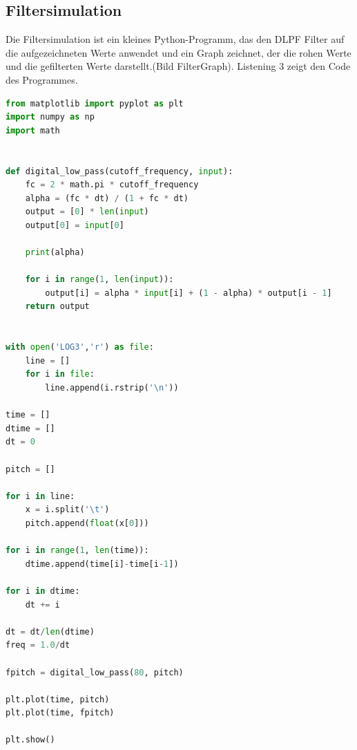 \documentclass[12pt,a4paper, ngerman]{article}
\begin{document}
\subsection{Filtersimulation}
Die Filtersimulation ist ein kleines Python-Programm, das den DLPF Filter auf die aufgezeichneten Werte anwendet und ein Graph zeichnet, der die rohen Werte und die gefilterten Werte darstellt.(Bild FilterGraph). Listening 3 zeigt den Code des Programmes. 
\begin{lstlisting}[language=Python,caption=Filtersimulation]
from matplotlib import pyplot as plt
import numpy as np
import math


def digital_low_pass(cutoff_frequency, input):
    fc = 2 * math.pi * cutoff_frequency
    alpha = (fc * dt) / (1 + fc * dt)
    output = [0] * len(input)
    output[0] = input[0]

    print(alpha)

    for i in range(1, len(input)):
        output[i] = alpha * input[i] + (1 - alpha) * output[i - 1]
    return output


with open('LOG3','r') as file:
    line = []
    for i in file:
        line.append(i.rstrip('\n'))

time = []
dtime = []
dt = 0

pitch = []

for i in line:
    x = i.split('\t')
    pitch.append(float(x[0]))

for i in range(1, len(time)):
    dtime.append(time[i]-time[i-1])

for i in dtime:
    dt += i

dt = dt/len(dtime)
freq = 1.0/dt

fpitch = digital_low_pass(80, pitch)

plt.plot(time, pitch)
plt.plot(time, fpitch)

plt.show()
\end{lstlisting}
\end{document}
